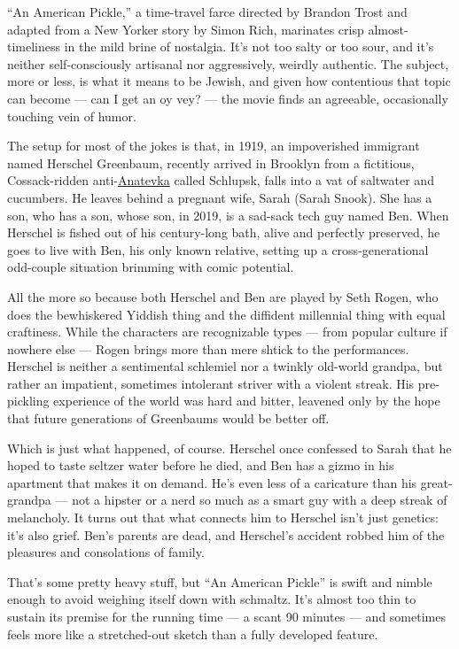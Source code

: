 ``An American Pickle,'' a time-travel farce directed by Brandon Trost
and adapted from a New Yorker story by Simon Rich, marinates crisp
almost-timeliness in the mild brine of nostalgia. It's not too salty or
too sour, and it's neither self-consciously artisanal nor aggressively,
weirdly authentic. The subject, more or less, is what it means to be
Jewish, and given how contentious that topic can become --- can I get an
oy vey? --- the movie finds an agreeable, occasionally touching vein of
humor.

The setup for most of the jokes is that, in 1919, an impoverished
immigrant named Herschel Greenbaum, recently arrived in Brooklyn from a
fictitious, Cossack-ridden
anti-\href{https://www.youtube.com/watch?v=F9E_PTTHvgI}{Anatevka} called
Schlupsk, falls into a vat of saltwater and cucumbers. He leaves behind
a pregnant wife, Sarah (Sarah Snook). She has a son, who has a son,
whose son, in 2019, is a sad-sack tech guy named Ben. When Herschel is
fished out of his century-long bath, alive and perfectly preserved, he
goes to live with Ben, his only known relative, setting up a
cross-generational odd-couple situation brimming with comic potential.

All the more so because both Herschel and Ben are played by Seth Rogen,
who does the bewhiskered Yiddish thing and the diffident millennial
thing with equal craftiness. While the characters are recognizable types
--- from popular culture if nowhere else --- Rogen brings more than mere
shtick to the performances. Herschel is neither a sentimental schlemiel
nor a twinkly old-world grandpa, but rather an impatient, sometimes
intolerant striver with a violent streak. His pre-pickling experience of
the world was hard and bitter, leavened only by the hope that future
generations of Greenbaums would be better off.

Which is just what happened, of course. Herschel once confessed to Sarah
that he hoped to taste seltzer water before he died, and Ben has a gizmo
in his apartment that makes it on demand. He's even less of a caricature
than his great-grandpa --- not a hipster or a nerd so much as a smart
guy with a deep streak of melancholy. It turns out that what connects
him to Herschel isn't just genetics: it's also grief. Ben's parents are
dead, and Herschel's accident robbed him of the pleasures and
consolations of family.

That's some pretty heavy stuff, but ``An American Pickle'' is swift and
nimble enough to avoid weighing itself down with schmaltz. It's almost
too thin to sustain its premise for the running time --- a scant 90
minutes --- and sometimes feels more like a stretched-out sketch than a
fully developed feature.

